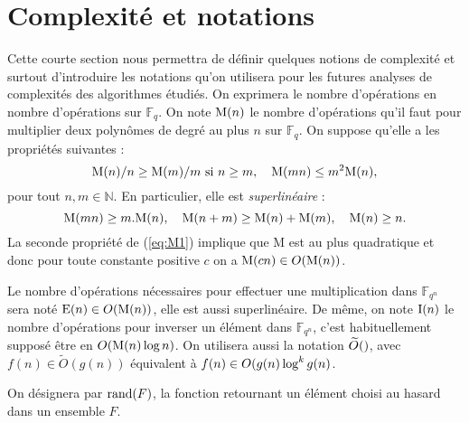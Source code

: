 \documentclass[a4paper]{article} %
\numberwithin{section}{part}
\numberwithin{equation}{section}
\newcommand\GF[1]{\mathbb{F}_{#1}}
\newcommand\NN{\mathbb{N}}
\newcommand\M[1]{\textup{M}(#1)}
\newcommand\E[1]{\textup{E}(#1)}
\newcommand\I[1]{\textup{I}(#1)}
\newcommand\tO[1]{\widetilde{O}(#1)}
\begin{document}
\section{Complexité et notations}
Cette courte section nous permettra de définir quelques notions de complexité
et surtout d'introduire les notations qu'on utilisera pour les futures analyses
de complexités des algorithmes étudiés.
On exprimera le nombre d'opérations en nombre d'opérations sur $\GF{q}$. On note
$\M{n}$ le nombre d'opérations qu'il faut pour multiplier deux polynômes
de degré au plus $n$ sur $\GF{q}$. On suppose qu'elle a les propriétés suivantes
:
\begin{equation}
\label{eq:M1}
\M{n}/n\geq\M{m}/m\textup{ si }n\geq m,\quad \M{mn} \leq m^2\M{n},
\end{equation}
pour tout $n, m\in\NN$. En particulier, elle est \emph{superlinéaire} :
\begin{equation}
\M{mn}\geq m.\M{n},\quad \M{n + m}\geq\M{n} + \M{m}, \quad \M{n}\geq n.
\end{equation}
La seconde propriété de (\ref{eq:M1}) implique que M est au plus quadratique et 
donc pour toute constante positive $c$ on a $\M{cn}\in O(\M{n})$.\par
Le nombre d'opérations nécessaires pour effectuer une multiplication dans
$\GF{q^n}$ sera noté $\E{n}\in O(\M{n})$, elle est aussi superlinéaire. De même,
on note $\I{n}$ le nombre d'opérations pour inverser un élément dans $\GF{q^n}$,
c'est habituellement supposé être en $O(\M{n}\,\textup{log\,}n)$.
On utilisera aussi la notation $\tO$, avec $f(n)\in\tO{g(n)}$
équivalent à $f(n)\in O(g(n)\,\textup{log}^k\,g(n)$.
\begin{defn}
On désignera par $\textup{rand}(F)$, la fonction retournant un élément choisi
au hasard dans un ensemble $F$.
\end{defn}
\end{document}
